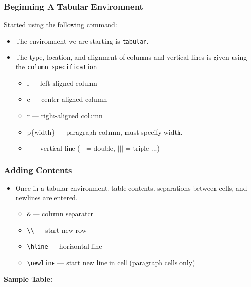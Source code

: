 \documentclass[notes=only]{beamer}
\newcommand{\snip}[1]
{
    
}
\newcommand{\pc}[1]
{
    \texttt{\textbackslash #1}
}
\begin{document}
\begin{frame} \frametitle{Beginning A Tabular Environment}
    Started using the following command:\\
    \snip{tabular.tex}
    \begin{itemize}
        \item The environment we are starting is \texttt{tabular}.
        \item The type, location, and alignment of columns and vertical lines is given using the \texttt{column specification}
        \begin{itemize}
            \item l --- left-aligned column
            \item c --- center-aligned column
            \item r --- right-aligned column
            \item p\{width\} --- paragraph column, must specify width.
            \item $|$ --- vertical line ($||$ = double, $|||$ =     triple ...) 
        \end{itemize}
    \end{itemize}
\end{frame}


\begin{frame} \frametitle{Adding Contents}
    \begin{itemize}
        \item Once in a tabular environment, table contents, separations between cells, and newlines are entered.\\
        \begin{itemize}
            \item \texttt{\&} --- column separator
            \item \texttt{\textbackslash\textbackslash} --- start new row
            \item \pc{hline} --- horizontal line
            \item \pc{newline} --- start new line in cell (paragraph cells only)
        \end{itemize}
    \end{itemize}
    
    \textbf{Sample Table:}
    
\end{frame}
\end{document}
